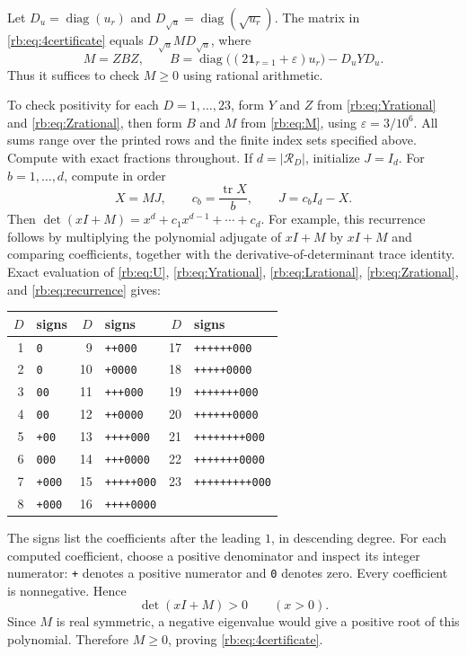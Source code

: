 Let $D_u=\operatorname{diag}(u_r)$ and $D_{\sqrt u}=\operatorname{diag}(\sqrt{u_r})$. The matrix in \eqref{rb:eq:4certificate} equals $D_{\sqrt u}MD_{\sqrt u}$, where
\begin{equation}\label{rb:eq:M}
 M=ZBZ,\qquad
 B=\operatorname{diag}\bigl((2\mathbf1_{r=1}+\varepsilon)u_r\bigr)-D_uYD_u.
\end{equation}
Thus it suffices to check $M\ge0$ using rational arithmetic.

To check positivity for each $D=1,\ldots,23$, form $Y$ and $Z$ from
\eqref{rb:eq:Yrational} and \eqref{rb:eq:Zrational}, then form $B$ and $M$ from
\eqref{rb:eq:M}, using $\varepsilon=3/10^6$. All sums range over the printed rows and
the finite index sets specified above. Compute with exact fractions
throughout. If $d=|\mathcal R_D|$, initialize $J=I_d$. For
$b=1,\ldots,d$, compute in order
\begin{equation}\label{rb:eq:recurrence}
 X=MJ,\qquad c_b=\frac{\operatorname{tr} X}{b},\qquad J=c_bI_d-X.
\end{equation}
Then $\det(xI+M)=x^d+c_1x^{d-1}+\cdots+c_d$. For example, this recurrence follows by multiplying the polynomial adjugate of $xI+M$ by $xI+M$ and comparing coefficients, together with the derivative-of-determinant trace identity. Exact evaluation of \eqref{rb:eq:U}, \eqref{rb:eq:Yrational}, \eqref{rb:eq:Lrational}, \eqref{rb:eq:Zrational}, and \eqref{rb:eq:recurrence} gives:
\begin{center}
\begin{tabular}{rl@{\qquad}rl@{\qquad}rl}
\toprule
$D$&signs&$D$&signs&$D$&signs\\
\midrule
1&\texttt{0}&9&\texttt{++000}&17&\texttt{++++++000}\\
2&\texttt{0}&10&\texttt{+0000}&18&\texttt{+++++0000}\\
3&\texttt{00}&11&\texttt{+++000}&19&\texttt{+++++++000}\\
4&\texttt{00}&12&\texttt{++0000}&20&\texttt{++++++0000}\\
5&\texttt{+00}&13&\texttt{++++000}&21&\texttt{++++++++000}\\
6&\texttt{000}&14&\texttt{+++0000}&22&\texttt{+++++++0000}\\
7&\texttt{+000}&15&\texttt{+++++000}&23&\texttt{+++++++++000}\\
8&\texttt{+000}&16&\texttt{++++0000}&&\\
\bottomrule
\end{tabular}
\end{center}
The signs list the coefficients after the leading $1$, in descending degree.
For each computed coefficient, choose a positive denominator and inspect
its integer numerator: \texttt{+} denotes a positive numerator and
\texttt{0} denotes zero. Every coefficient is nonnegative. Hence
\[
 \det(xI+M)>0\qquad(x>0).
\]
Since $M$ is real symmetric, a negative eigenvalue would give a positive
root of this polynomial. Therefore $M\ge0$, proving
\eqref{rb:eq:4certificate}.


\endgroup
